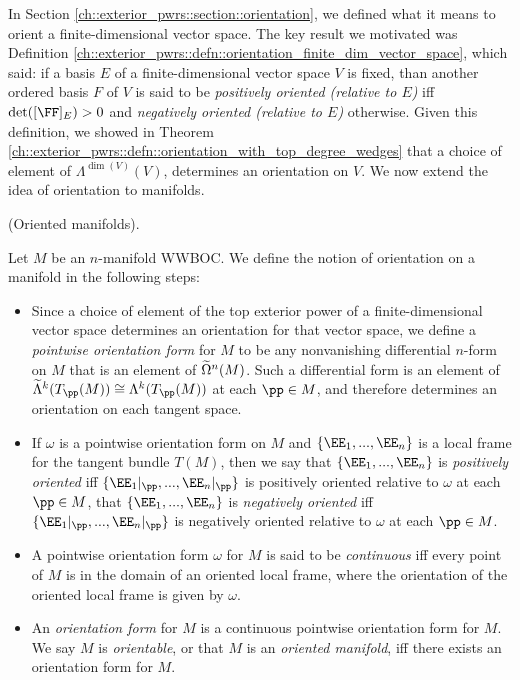 In Section \ref{ch::exterior_pwrs::section::orientation}, we defined what it means to orient a finite-dimensional vector space. The key result we motivated was Definition \ref{ch::exterior_pwrs::defn::orientation_finite_dim_vector_space}, which said: if a basis $E$ of a finite-dimensional vector space $V$ is fixed, than another ordered basis $F$ of $V$ is said to be \textit{positively oriented (relative to $E$)} iff $\det([\FF]_E) > 0$ and \textit{negatively oriented (relative to $E$)} otherwise. Given this definition, we showed in Theorem \ref{ch::exterior_pwrs::defn::orientation_with_top_degree_wedges} that a choice of element of $\Lambda^{\dim(V)}(V)$, determines an orientation on $V$. We now extend the idea of orientation to manifolds.

\begin{defn}
     (Oriented manifolds).
    
    Let $M$ be an $n$-manifold WWBOC. We define the notion of orientation on a manifold in the following steps:
    
    \begin{itemize}
        \item Since a choice of element of the top exterior power of a finite-dimensional vector space determines an orientation for that vector space, we define a \textit{pointwise orientation form} for $M$ to be any nonvanishing differential $n$-form on $M$ that is an element of $\widetilde{\Omega}^n(M)$. Such a differential form is an element of $\tLambda^k(T_\pp(M)) \cong \Lambda^k(T_\pp(M))$ at each $\pp \in M$, and therefore determines an orientation on each tangent space.
        \item If $\omega$ is a pointwise orientation form on $M$ and $\{\EE_1, ..., \EE_n\}$ is a local frame for the tangent bundle $T(M)$, then we say that $\{\EE_1, ..., \EE_n\}$ is \textit{positively oriented} iff $\{\EE_1|_\pp, ..., \EE_n|_\pp\}$ is positively oriented relative to $\omega$ at each $\pp \in M$, that $\{\EE_1, ..., \EE_n\}$ is \textit{negatively oriented} iff $\{\EE_1|_\pp, ..., \EE_n|_\pp\}$ is negatively oriented relative to $\omega$ at each $\pp \in M$.
        \item A pointwise orientation form $\omega$ for $M$ is said to be \textit{continuous} iff every point of $M$ is in the domain of an oriented local frame, where the orientation of the oriented local frame is given by $\omega$.
        \item An \textit{orientation form} for $M$ is a continuous pointwise orientation form for $M$. We say $M$ is \textit{orientable}, or that $M$ is an \textit{oriented manifold}, iff there exists an orientation form for $M$.
    \end{itemize}
\end{defn}

